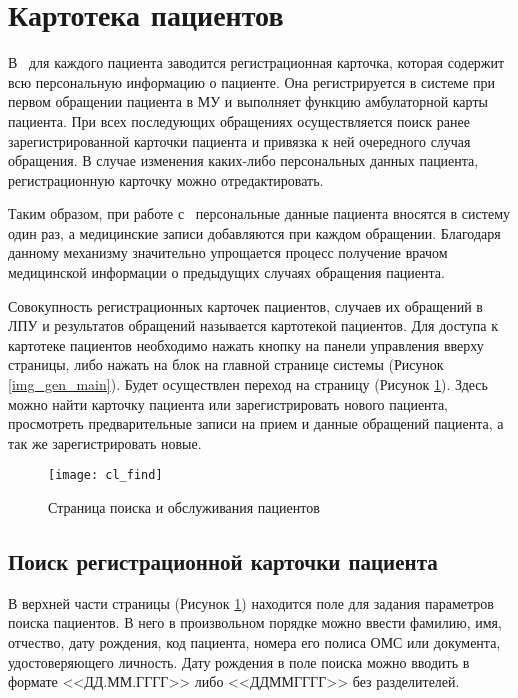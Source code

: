 \newpage
\section{Картотека пациентов}

В \tmis ~для каждого пациента заводится регистрационная карточка, которая содержит всю персональную информацию о пациенте. Она регистрируется в системе при первом обращении пациента в МУ и выполняет функцию амбулаторной карты пациента. При всех последующих обращениях осуществляется поиск ранее зарегистрированной карточки пациента и привязка к ней очередного случая обращения. В случае изменения каких-либо персональных данных пациента, регистрационную карточку можно отредактировать. 

Таким образом, при работе с \tmis~персональные данные пациента вносятся в систему один раз, а медицинские записи добавляются при каждом обращении. Благодаря данному механизму значительно упрощается процесс получение врачом медицинской информации о предыдущих случаях обращения пациента.

Совокупность регистрационных карточек пациентов, случаев их обращений в ЛПУ и результатов обращений называется картотекой пациентов. Для доступа к картотеке пациентов необходимо нажать кнопку  на панели управления вверху страницы, либо нажать на блок  на главной странице системы (Рисунок \ref{img_gen_main}). Будет осуществлен переход на страницу  (Рисунок \ref{img_cl_find}). Здесь можно найти карточку пациента или зарегистрировать нового пациента, просмотреть предварительные записи на прием и данные обращений пациента, а так же зарегистрировать новые.

\begin{figure}[ht]\centering
 \texttt{[image: cl\_find]}
 \caption{Страница поиска и обслуживания пациентов}
 \label{img_cl_find}
\end{figure} 

\subsection{Поиск регистрационной карточки пациента} \label{cl_find}

В верхней части страницы   (Рисунок \ref{img_cl_find}) находится поле для задания параметров поиска пациентов. В него в произвольном порядке можно ввести фамилию, имя, отчество, дату рождения, код пациента, номера его полиса ОМС или документа, удостоверяющего личность. Дату рождения в поле поиска можно вводить в формате <<ДД.ММ.ГГГГ>> либо <<ДДММГГГГ>> без разделителей. 

